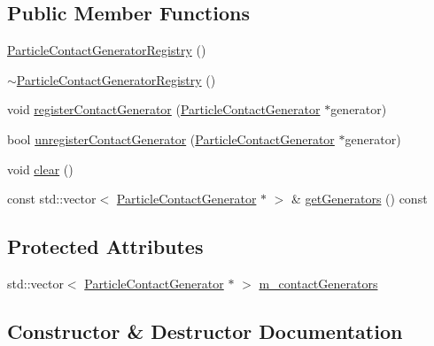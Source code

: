 \subsection*{Public Member Functions}
\begin{DoxyCompactItemize}
\item 
\mbox{\hyperlink{classr3_1_1_particle_contact_generator_registry_a2c26127b369a7da81d5d29e4734633e6}{Particle\+Contact\+Generator\+Registry}} ()
\item 
\mbox{\hyperlink{classr3_1_1_particle_contact_generator_registry_a26a9ed03c6e050ffa99669bd0928d520}{$\sim$\+Particle\+Contact\+Generator\+Registry}} ()
\item 
void \mbox{\hyperlink{classr3_1_1_particle_contact_generator_registry_a34d44783a363a513217dec694f625687}{register\+Contact\+Generator}} (\mbox{\hyperlink{classr3_1_1_particle_contact_generator}{Particle\+Contact\+Generator}} $\ast$generator)
\item 
bool \mbox{\hyperlink{classr3_1_1_particle_contact_generator_registry_ae8de6dd84335777644f7eac93b82ba1e}{unregister\+Contact\+Generator}} (\mbox{\hyperlink{classr3_1_1_particle_contact_generator}{Particle\+Contact\+Generator}} $\ast$generator)
\item 
void \mbox{\hyperlink{classr3_1_1_particle_contact_generator_registry_a8c24a369a980542a769875466eb835d0}{clear}} ()
\item 
const std\+::vector$<$ \mbox{\hyperlink{classr3_1_1_particle_contact_generator}{Particle\+Contact\+Generator}} $\ast$ $>$ \& \mbox{\hyperlink{classr3_1_1_particle_contact_generator_registry_a31b80b662b52afd910ba3d4d07fd8649}{get\+Generators}} () const
\end{DoxyCompactItemize}
\subsection*{Protected Attributes}
\begin{DoxyCompactItemize}
\item 
std\+::vector$<$ \mbox{\hyperlink{classr3_1_1_particle_contact_generator}{Particle\+Contact\+Generator}} $\ast$ $>$ \mbox{\hyperlink{classr3_1_1_particle_contact_generator_registry_abefd730c20539681ed0fac53ccd5f8ab}{m\+\_\+contact\+Generators}}
\end{DoxyCompactItemize}


\subsection{Constructor \& Destructor Documentation}
\mbox{\label{classr3_1_1_particle_contact_generator_registry_a2c26127b369a7da81d5d29e4734633e6}} 

